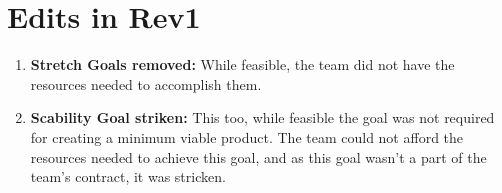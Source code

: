 \documentclass[fullpage]{article}
\newcommand{\be}{\begin{enumerate}}
\newcommand{\ee}{\end{enumerate}}
\newcommand{\bc}{\begin{center}}
\newcommand{\ec}{\end{center}}
\begin{document}
\section{Edits in Rev1}
\bc

\be
\item \textbf{Stretch Goals removed:} While feasible, the team did not have the resources needed to accomplish them.
\item \textbf{Scability Goal striken: }This too, while feasible the goal was not required for creating a minimum viable product. The team could not afford the resources needed to achieve this goal, and as this goal wasn't a part of the team's contract, it was stricken.
\ee
\ec
\end{document}
